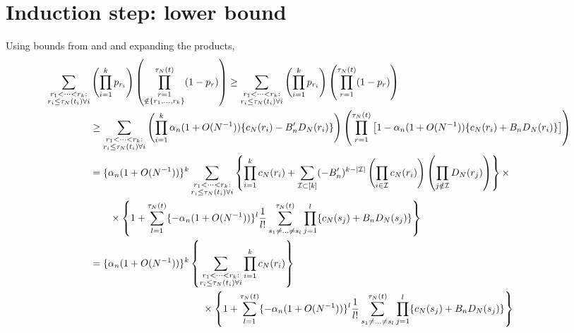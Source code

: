\documentclass{article}
\newcommand{\1}[1]{\mathbbm{1}_{#1}}
\begin{document}
\section*{Induction step: lower bound}

Using bounds from \citet[Equation (14)]{brown2020} and \citet[Lemma 1 Case 1]{koskela2018} and expanding the products,
\begin{align}
\sum_{\substack{r_1 <\dots< r_k :\\ r_i \leq \tau_N(t_i) \forall i}}
&\left( \prod_{i=1}^k p_{r_i} \right)
\left( \prod_{\substack{r=1 \\ \notin \{r_1,\dots,r_k\} }}^{\tau_N(t)} (1-p_r) \right)
\geq \sum_{\substack{r_1 <\dots< r_k :\\ r_i \leq \tau_N(t_i) \forall i}}
\left( \prod_{i=1}^k p_{r_i} \right)
\left( \prod_{r=1}^{\tau_N(t)} (1-p_r) \right) \notag\\
&\geq \sum_{\substack{r_1 <\dots< r_k :\\ r_i \leq \tau_N(t_i) \forall i}}
\left( \prod_{i=1}^k \alpha_n (1 + O(N^{-1}) ) \{ c_N(r_i) - B_n^\prime D_N(r_i) \} \right)
\left( \prod_{r=1}^{\tau_N(t)} \left[ 1 - \alpha_n (1 + O(N^{-1}) ) \{ c_N(r_i) + B_n D_N(r_i) \} \right] \right) \notag\\
&= \{ \alpha_n (1 + O(N^{-1}) ) \}^k
\sum_{\substack{r_1 <\dots< r_k :\\ r_i \leq \tau_N(t_i) \forall i}}
\left\{ \prod_{i=1}^k c_N(r_i) + \sum_{\mathcal{I} \subset [k]} (-B_n^\prime)^{k-|\mathcal{I}|}
\left( \prod_{i\in\mathcal{I}} c_N(r_i) \right)
\left( \prod_{j\notin\mathcal{I}} D_N(r_j) \right)
\right\} \times \notag\\
&\qquad\times \left\{ 1 + \sum_{l=1}^{\tau_N(t)} \{ - \alpha_n (1 + O(N^{-1}) ) \}^l \frac{1}{l!}
\sum_{s_1 \neq \dots \neq s_l}^{\tau_N(t)} \prod_{j=1}^l
\{ c_N(s_j) + B_n D_N(s_j) \} \right\} \notag\\
&= \{ \alpha_n (1 + O(N^{-1}) ) \}^k
\left\{ \sum_{\substack{r_1 <\dots< r_k :\\ r_i \leq \tau_N(t_i) \forall i}} \prod_{i=1}^k c_N(r_i) \right\} \notag\\
&\hspace{4cm}\times \left\{ 1 + \sum_{l=1}^{\tau_N(t)} \{ - \alpha_n (1 + O(N^{-1}) ) \}^l \frac{1}{l!}
\sum_{s_1 \neq \dots \neq s_l}^{\tau_N(t)} \prod_{j=1}^l
\{ c_N(s_j) + B_n D_N(s_j) \} \right\} \notag\\

\end{align}
\end{document}
